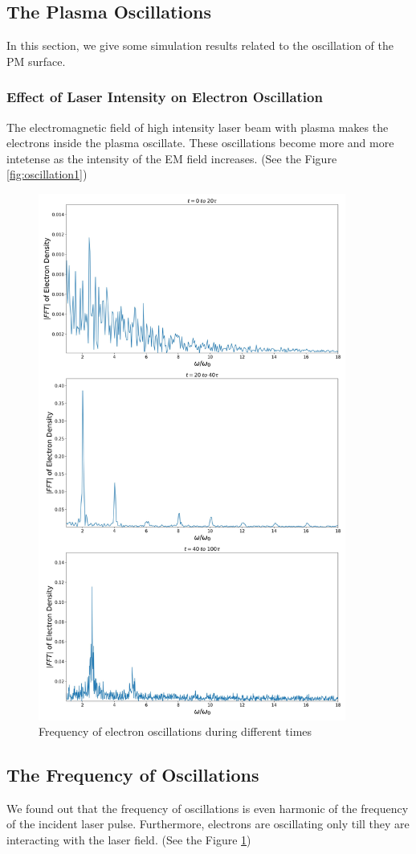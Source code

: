 \documentclass[12pt]{article}
\newenvironment{changemargin}[2]{%
\begin{list}{}{%
\setlength{\topsep}{0pt}%
\setlength{\leftmargin}{#1}%
\setlength{\rightmargin}{#2}%
\setlength{\listparindent}{\parindent}%
\setlength{\itemindent}{\parindent}%
\setlength{\parsep}{\parskip}%
}%
\item[]}{\end{list}}
\begin{document}
\begin{changemargin}{-2cm}{-2cm}
    \subsection{The Plasma Oscillations}
    In this section, we give some simulation results related to the oscillation of the PM surface.
    \subsubsection{Effect of Laser Intensity on Electron Oscillation}
    The electromagnetic field of high intensity laser beam with plasma makes the electrons inside the plasma oscillate. These oscillations become more and more intetense as the intensity of the EM field increases. (See the Figure \ref{fig:oscillation1})
    \begin{figure}[t]
        \centering
        \includegraphics[width=0.9\textwidth, height=0.9\textwidth]{images/oscillation2.jpg}
        \caption{Frequency of electron oscillations during different times}
        \label{fig:oscillation2}
    \end{figure}
    \subsection{The Frequency of Oscillations}
    We found out that the frequency of oscillations is even harmonic of the frequency of the incident laser pulse. Furthermore, electrons are oscillating only till they are interacting with the laser field. (See the Figure \ref{fig:oscillation2})

\end{changemargin}
\end{document}

